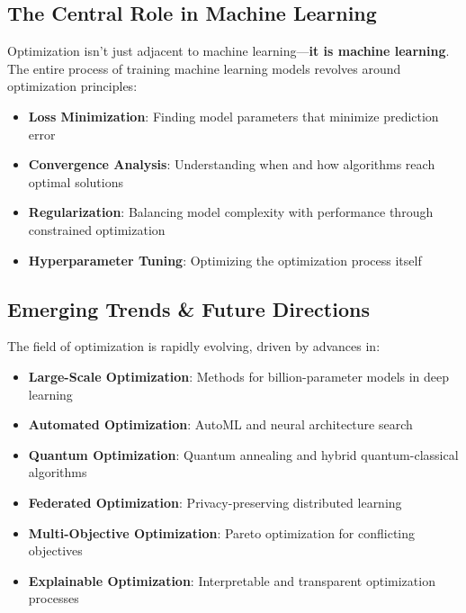 \documentclass[
  letterpaper,
  DIV=11,
  numbers=noendperiod]{scrreprt}
\providecommand{\tightlist}{%
  \setlength{\itemsep}{0pt}\setlength{\parskip}{0pt}}
\begin{document}
\subsection{The Central Role in Machine
Learning}\label{the-central-role-in-machine-learning}

Optimization isn't just adjacent to machine learning---\textbf{it is
machine learning}. The entire process of training machine learning
models revolves around optimization principles:

\begin{itemize}
\tightlist
\item
  \textbf{Loss Minimization}: Finding model parameters that minimize
  prediction error
\item
  \textbf{Convergence Analysis}: Understanding when and how algorithms
  reach optimal solutions
\item
  \textbf{Regularization}: Balancing model complexity with performance
  through constrained optimization
\item
  \textbf{Hyperparameter Tuning}: Optimizing the optimization process
  itself
\end{itemize}

\subsection{Emerging Trends \& Future
Directions}\label{emerging-trends-future-directions}

The field of optimization is rapidly evolving, driven by advances in:

\begin{itemize}
\tightlist
\item
  \textbf{Large-Scale Optimization}: Methods for billion-parameter
  models in deep learning
\item
  \textbf{Automated Optimization}: AutoML and neural architecture search
\item
  \textbf{Quantum Optimization}: Quantum annealing and hybrid
  quantum-classical algorithms\\
\item
  \textbf{Federated Optimization}: Privacy-preserving distributed
  learning
\item
  \textbf{Multi-Objective Optimization}: Pareto optimization for
  conflicting objectives
\item
  \textbf{Explainable Optimization}: Interpretable and transparent
  optimization processes
\end{itemize}
\end{document}
